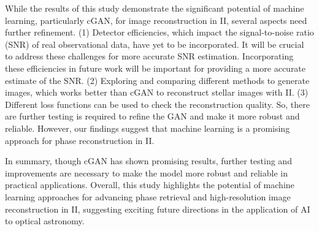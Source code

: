 While the results of this study demonstrate the significant potential of machine learning, particularly cGAN, for image reconstruction in II, several aspects need further refinement. (1) Detector efficiencies, which impact the signal-to-noise ratio (SNR) of real observational data, have yet to be incorporated. It will be crucial to address these challenges for more accurate SNR estimation. Incorporating these efficiencies in future work will be important for providing a more accurate estimate of the SNR. (2) Exploring and comparing different methods to generate images, which works better than cGAN to reconstruct stellar images with II. (3) Different loss functions can be used to check the reconstruction quality. So, there are further testing is required to refine the GAN and make it more robust and reliable. However, our findings suggest that machine learning is a promising approach for phase reconstruction in II.

In summary, though cGAN has shown promising results, further testing and improvements are necessary to make the model more robust and reliable in practical applications. Overall, this study highlights the potential of machine learning approaches for advancing phase retrieval and high-resolution image reconstruction in II, suggesting exciting future directions in the application of AI to optical astronomy.